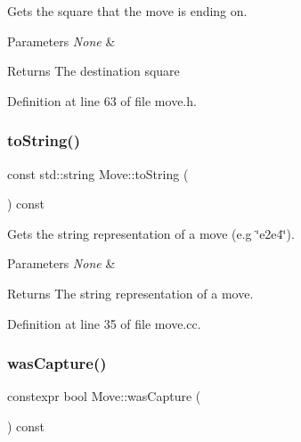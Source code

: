 Gets the square that the move is ending on. 


\begin{DoxyParams}{Parameters}
{\em None} & \\
\hline
\end{DoxyParams}
\begin{DoxyReturn}{Returns}
The destination square 
\end{DoxyReturn}


Definition at line 63 of file move.\+h.

\mbox{\label{classMove_a521cf6fe1679a7354ee007037df2da34}} 
\subsubsection{\texorpdfstring{to\+String()}{toString()}}
{\footnotesize\ttfamily const std\+::string Move\+::to\+String (\begin{DoxyParamCaption}{ }\end{DoxyParamCaption}) const\hspace{0.3cm}{\ttfamily [noexcept]}}



Gets the string representation of a move (e.\+g \char`\"{}e2e4\char`\"{}). 


\begin{DoxyParams}{Parameters}
{\em None} & \\
\hline
\end{DoxyParams}
\begin{DoxyReturn}{Returns}
The string representation of a move. 
\end{DoxyReturn}


Definition at line 35 of file move.\+cc.

\mbox{\label{classMove_aa270da1cc5c6f10882cd14e9a61d2ebe}} 
\subsubsection{\texorpdfstring{was\+Capture()}{wasCapture()}}
{\footnotesize\ttfamily constexpr bool Move\+::was\+Capture (\begin{DoxyParamCaption}{ }\end{DoxyParamCaption}) const\hspace{0.3cm}{\ttfamily [inline]}}



